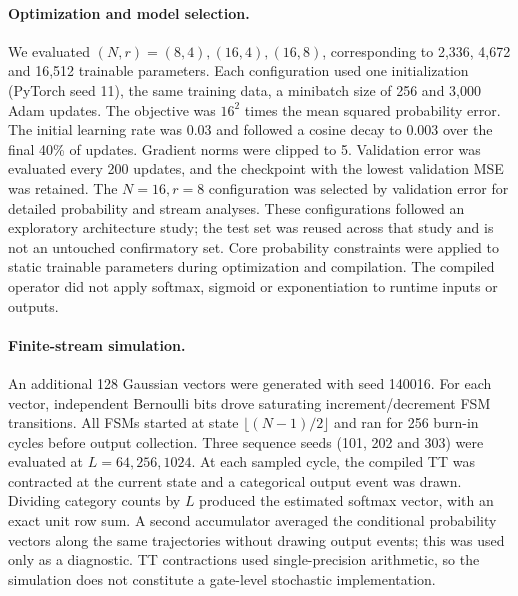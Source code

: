 \paragraph{Optimization and model selection.}
We evaluated $(N,r)=(8,4),(16,4),(16,8)$, corresponding to 2,336, 4,672
and 16,512 trainable parameters. Each configuration used one initialization
(PyTorch seed 11), the same training data, a minibatch size of 256 and 3,000
Adam updates. The objective was $16^2$ times the mean squared probability
error. The initial learning rate was 0.03 and followed a cosine decay to
0.003 over the final 40\% of updates. Gradient norms were clipped to 5.
Validation error was evaluated every 200 updates, and the checkpoint with
the lowest validation MSE was retained. The $N=16,r=8$ configuration was
selected by validation error for detailed probability and stream analyses.
These configurations followed an exploratory architecture study; the test
set was reused across that study and is not an untouched confirmatory set.
Core probability constraints were applied to static trainable parameters
during optimization and compilation. The compiled operator did not apply
softmax, sigmoid or exponentiation to runtime inputs or outputs.

\paragraph{Finite-stream simulation.}
An additional 128 Gaussian vectors were generated with seed 140016.
For each vector, independent Bernoulli bits drove saturating increment/decrement
FSM transitions. All FSMs started at state $\lfloor(N-1)/2\rfloor$ and
ran for 256 burn-in cycles before output collection. Three sequence seeds
(101, 202 and 303) were evaluated at $L=64,256,1024$. At each sampled
cycle, the compiled TT was contracted at the current state and a categorical
output event was drawn. Dividing category counts by $L$ produced the
estimated softmax vector, with an exact unit row sum. A second accumulator
averaged the conditional probability vectors along the same trajectories
without drawing output events; this was used only as a diagnostic. TT
contractions used single-precision arithmetic, so the simulation does not
constitute a gate-level stochastic implementation.

